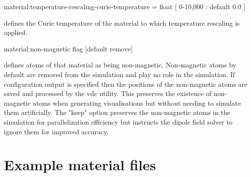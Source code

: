 {\zicf material:temperature-rescaling-curie-temperature = float [ 0-10,000 : default 0.0 ]} defines the Curie temperature of the material to which temperature rescaling is applied.

{\zicf material:non-magnetic flag [default remove]}
 defines atoms of
that material as being non-magnetic. Non-magnetic atoms by default are removed
from the simulation and play no role in the simulation. If configuration
output is specified then the positions of the non-magnetic atoms are saved and
processed by the vdc utility. This preserves the existence of non-magnetic
atoms when generating visualisations but without needing to simulate them
artificially. The "keep" option preserves the non-magnetic atoms in the
simulation for parallelization efficiency but instructs the dipole field solver
to ignore them for improved accuracy.\\


\section*{Example material files}








%
